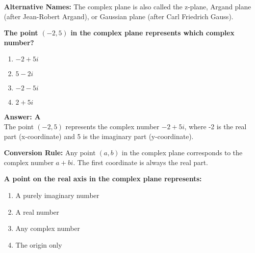 \documentclass[12pt,a4paper]{article}
\begin{document}
\begin{conceptbox}
\textbf{Alternative Names:} The complex plane is also called the z-plane, Argand plane (after Jean-Robert Argand), or Gaussian plane (after Carl Friedrich Gauss).
\end{conceptbox}

\newpage
\begin{questiontitle}[MCQ 78]
\textbf{The point \( (-2, 5) \) in the complex plane represents which complex number?}
\end{questiontitle}

\begin{partbox}[Options]
\begin{enumerate}[label=\Alph*.]
    \item \( -2 + 5i \)
    \item \( 5 - 2i \)
    \item \( -2 - 5i \)
    \item \( 2 + 5i \)
\end{enumerate}
\end{partbox}

\begin{answerstyle}
\textbf{Answer: A} \\
The point \( (-2, 5) \) represents the complex number \( -2 + 5i \), where -2 is the real part (x-coordinate) and 5 is the imaginary part (y-coordinate).
\end{answerstyle}

\begin{conceptbox}
\textbf{Conversion Rule:} Any point \( (a, b) \) in the complex plane corresponds to the complex number \( a + bi \). The first coordinate is always the real part.
\end{conceptbox}

\newpage
\begin{questiontitle}[MCQ 79]
\textbf{A point on the real axis in the complex plane represents:}
\end{questiontitle}

\begin{partbox}[Options]
\begin{enumerate}[label=\Alph*.]
    \item A purely imaginary number
    \item A real number
    \item Any complex number
    \item The origin only
\end{enumerate}
\end{partbox}
\end{document}

